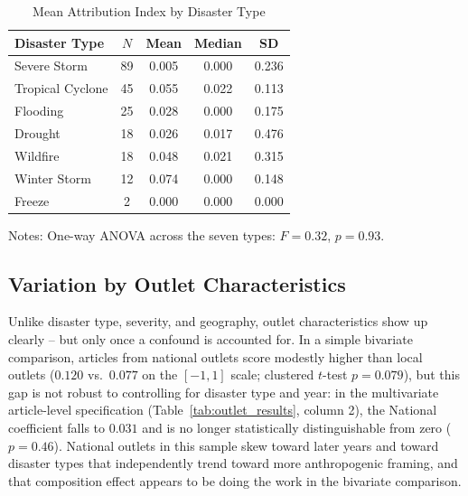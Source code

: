 \documentclass[12pt]{article}
\begin{document}
\begin{table}[ht]
\centering
\caption{Mean Attribution Index by Disaster Type}
\label{tab:type_means}
\begin{threeparttable}
\begin{tabular}{lcccc}
\toprule
Disaster Type & $N$ & Mean & Median & SD \\
\midrule
Severe Storm      & 89 & 0.005 & 0.000 & 0.236 \\
Tropical Cyclone  & 45 & 0.055 & 0.022 & 0.113 \\
Flooding          & 25 & 0.028 & 0.000 & 0.175 \\
Drought           & 18 & 0.026 & 0.017 & 0.476 \\
Wildfire          & 18 & 0.048 & 0.021 & 0.315 \\
Winter Storm      & 12 & 0.074 & 0.000 & 0.148 \\
Freeze            &  2 & 0.000 & 0.000 & 0.000 \\
\bottomrule
\end{tabular}
\begin{tablenotes}
\small
\item Notes: One-way ANOVA across the seven types: $F=0.32$, $p=0.93$.
\end{tablenotes}
\end{threeparttable}
\end{table}

\subsection{Variation by Outlet Characteristics}
\label{sec:outlet_results}

Unlike disaster type, severity, and geography, outlet characteristics show
up clearly -- but only once a confound is accounted for. In a simple
bivariate comparison, articles from national outlets score modestly higher
than local outlets ($0.120$ vs.\ $0.077$ on the $[-1,1]$ scale; clustered
$t$-test $p=0.079$), but this gap is not robust to controlling for
disaster type and year: in the multivariate article-level specification
(Table~\ref{tab:outlet_results}, column 2), the National coefficient falls
to $0.031$ and is no longer statistically distinguishable from zero
($p=0.46$). National outlets in this sample skew toward later years and
toward disaster types that independently trend toward more anthropogenic
framing, and that composition effect appears to be doing the work in the
bivariate comparison.
\end{document}

